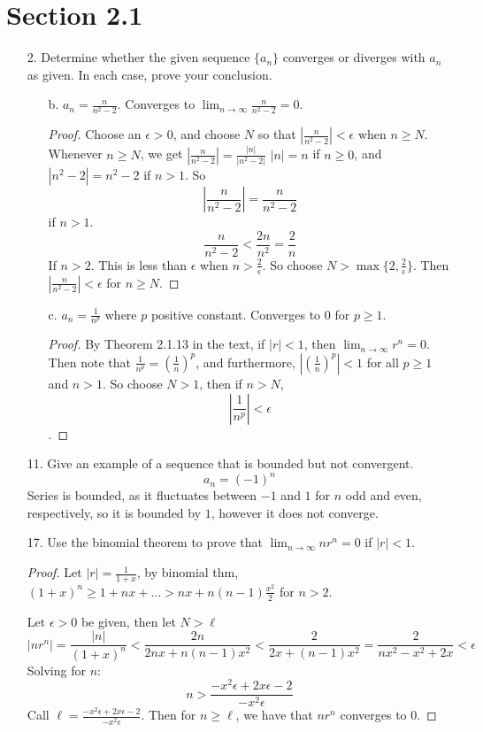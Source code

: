 \documentclass[hidelinks,12pt]{article}
\title{\scalebox{2}{Math 523 Homework 2}}
\author{\scalebox{1.5}{Theo Koss}}
\date{September 2023}
\renewcommand{\geq}{\geqslant}
\begin{document}
\maketitle
\section*{Section 2.1}
\begin{enumerate}
    \item[2.]Determine whether the given sequence $\{a_n\}$ converges or diverges with $a_n$ as given. In
 each case, prove your conclusion.
    \begin{enumerate}
        \item[b.]$a_n=\frac{n}{n^2-2}$. Converges to $\lim_{n\to\infty}\frac{n}{n^2-2}=0$.\begin{proof}
            Choose an $\epsilon>0$, and choose $N$ so that $|\frac{n}{n^2-2}|<\epsilon$ when $n\geq N$. Whenever $n\geq N$, we get $|\frac{n}{n^2-2}|=\frac{|n|}{|n^2-2|}$ $|n|=n$ if $n\geq0$, and $|n^2-2|=n^2-2$ if $n>1$. So $$|\frac{n}{n^2-2}|=\frac{n}{n^2-2}$$ if $n>1$. $$\frac{n}{n^2-2}<\frac{2n}{n^2}=\frac{2}{n}$$ If $n>2$. This is less than $\epsilon$ when $n>\frac{2}{\epsilon}$. So choose $N>\max\{2,\frac{2}{\epsilon}\}$. Then $|\frac{n}{n^2-2}|<\epsilon$ for $n\geq N$.
        \end{proof}
        \item[c.]$a_n=\frac{1}{n^p}$ where $p$ positive constant. Converges to $0$ for $p\geq1$.\begin{proof}
            By Theorem 2.1.13 in the text, if $|r|<1$, then $\lim_{n\to\infty}r^n=0$. Then note that $\frac{1}{n^p}=(\frac{1}{n})^p$, and furthermore, $|(\frac{1}{n})^p|<1$ for all $p\geq1$ and $n>1$. So choose $N>1$, then if $n>N$, $$|\frac{1}{n^p}|<\epsilon$$.
        \end{proof}
    \end{enumerate}
    \item[11.]Give an example of a sequence that is bounded but not convergent.$$a_n=(-1)^n$$ Series is bounded, as it fluctuates between $-1$ and $1$ for $n$ odd and even, respectively, so it is bounded by $1$, however it does not converge.
    \item[17.]Use the binomial theorem to prove that $\lim_{n\to\infty}nr^n=0$ if $|r|<1$.\begin{proof}
       Let $|r|=\frac{1}{1+x}$, by binomial thm, $(1+x)^n\geq1+nx+...>nx+n(n-1)\frac{x^2}{2}$ for $n>2$.\par\null\par Let $\epsilon>0$ be given, then let $N>\ell$ $$|nr^n|=\frac{|n|}{(1+x)^n}<\frac{2n}{2nx+n(n-1)x^2}<\frac{2}{2x+(n-1)x^2}=\frac{2}{nx^2-x^2+2x}<\epsilon$$ Solving for $n$: $$n>\frac{-x^2\epsilon+2x\epsilon-2}{-x^2\epsilon}$$ Call $\ell=\frac{-x^2\epsilon+2x\epsilon-2}{-x^2\epsilon}$. Then for $n\geq\ell$, we have that $nr^n$ converges to $0$.
    \end{proof}
\end{enumerate}
\end{document}
